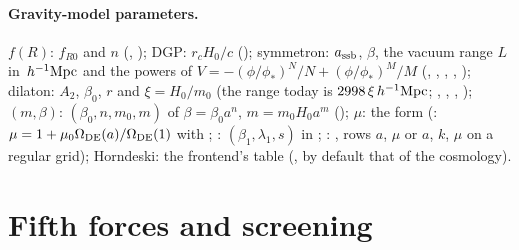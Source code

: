 \paragraph*{Gravity-model parameters.} $f(R)$: $f_{R0}$ and $n$ (,
); DGP: $r_cH_0/c$ (); symmetron: $a_{\rm ssb}$, $\beta$,
the vacuum range $L$ in $\,h^{-1}\mathrm{Mpc}$ and the powers of $V=-(\phi/\phi_*)^N/N+(\phi/\phi_*)^M/M$
(, , ,
, ); dilaton: $A_2$, $\beta_0$, $r$ and $\xi=H_0/m_0$ (the
range today is $2998\,\xi\,h^{-1}\mathrm{Mpc}$; , ,
, ); $(m,\beta)$: $(\beta_0,n,m_0,m)$ of $\beta=\beta_0a^n$,
$m=m_0H_0a^m$ (); $\mu$: the form  (:
$\mu=1+\mu_0\Omega_{\rm DE}(a)/\Omega_{\rm DE}(1)$ with ; : $(\beta_1,\lambda_1,s)$ in
; : , rows $a$, $\mu$ or $a$, $k$, $\mu$ on a
regular grid); Horndeski: the frontend's table (, by default that of the
cosmology).

\section{Fifth forces and screening}\label{sec:mgsim-screening}

